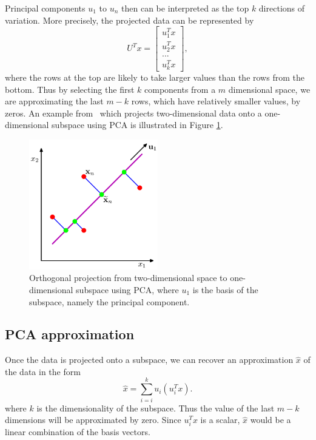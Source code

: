 Principal components $u_1$ to $u_n$ then can be interpreted as the top $k$ directions of variation. More precisely, the projected data can be represented by 
\begin{equation}
	U^Tx = 
	\begin{bmatrix}
		u_1^Tx \\
		u_2^Tx \\
		...	\\
		u_k^Tx
	\end{bmatrix},
\end{equation}
where the rows at the top are likely to take larger values than the rows from the bottom. Thus by selecting the first $k$ components from a $m$ dimensional space, we are approximating the last $m-k$ rows, which have relatively smaller values, by zeros. An example from~\cite{bishop2006pattern} which projects two-dimensional data onto a one-dimensional subspace using PCA is illustrated in Figure \ref{pcafig}.
\begin{figure}[h!]
  \centering
  \label{pcafig}
  \includegraphics[width=0.5\textwidth]{pics/pca.png}
  \caption{ Orthogonal projection from two-dimensional space to one-dimensional subspace using PCA, where $u_1$ is the basis of the subspace, namely the principal component.}
\end{figure}

\subsection{PCA approximation}
\label{PCA approximation}
Once the data is projected onto a subspace, we can recover an approximation $\hat{x}$ of the data in the form
\begin{equation}
\label{pcaeq1}
	\hat{x} = \sum\limits_{i=i}^ku_i(u_i^Tx).
\end{equation}
where $k$ is the dimensionality of the subspace. Thus the value of the last $m-k$ dimensions will be approximated by zero. Since $u_i^Tx$ is a scalar, $\hat{x}$ would be a linear combination of the basis vectors.


